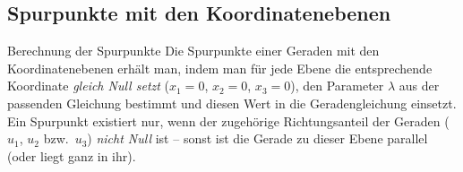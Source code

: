 \subsection{Spurpunkte mit den Koordinatenebenen}
    \begin{merke}{Berechnung der Spurpunkte}{}
Die Spurpunkte einer Geraden mit den Koordinatenebenen erhält man, indem man
für jede Ebene die entsprechende Koordinate \emph{gleich Null setzt}
($x_1=0$, $x_2=0$, $x_3=0$), den Parameter $\lambda$ aus der passenden Gleichung
bestimmt und diesen Wert in die Geradengleichung einsetzt.\\[0.5em]
Ein Spurpunkt existiert nur, wenn der zugehörige Richtungsanteil der Geraden
($u_1$, $u_2$ bzw.\ $u_3$) \emph{nicht Null} ist – sonst ist die Gerade zu dieser
Ebene parallel (oder liegt ganz in ihr).
\end{merke}
